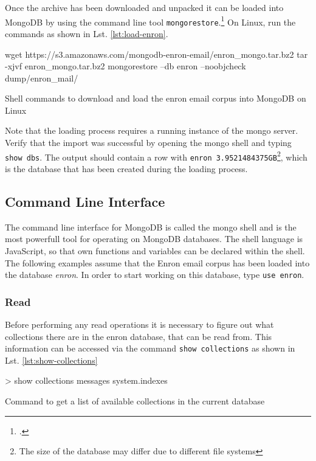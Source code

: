 Once the archive has been downloaded and unpacked it can be loaded into MongoDB
by using the command line tool
\texttt{mongorestore}.\footcite[Cf.][]{mongo_restore}
 On Linux, run the commands as shown in Lst. \ref{lst:load-enron}.

\begin{listing}
    \begin{bashcode}
    wget https://s3.amazonaws.com/mongodb-enron-email/enron_mongo.tar.bz2
    tar -xjvf enron_mongo.tar.bz2
    mongorestore --db enron --noobjcheck dump/enron_mail/
    \end{bashcode}
    \caption{Shell commands to download and load the enron email corpus into MongoDB on Linux}
    \label{lst:load-enron}
\end{listing}

Note that the loading process requires a running instance of the mongo server.
Verify that the import was successful by opening the mongo shell and typing
\texttt{show dbs}.
The output should contain a row with \texttt{enron 3.9521484375GB}\footnote{The
size of the database may differ due to different file systems}, which is the
database that has been created during the loading process.


\subsection{Command Line Interface}
\label{sec:usage-cli}

The command line interface for MongoDB is called the mongo shell and is the most powerfull
tool for operating on MongoDB databases. The shell language is JavaScript, so that own
functions and variables can be declared within the shell.
The following examples assume that the Enron email corpus has been loaded into the database \textit{enron}.
In order to start working on this database, type \texttt{use enron}.

\subsubsection{Read}
Before performing any read operations it is necessary to figure out what collections
there are in the enron database, that can be read from. This information can be accessed
via the command \texttt{show collections} as shown in Lst. \ref{lst:show-collections}

\begin{listing}
    \begin{javascriptcode}
> show collections
messages
system.indexes
    \end{javascriptcode}
    \caption{Command to get a list of available collections in the current database}
    \label{lst:show-collections}
\end{listing}

